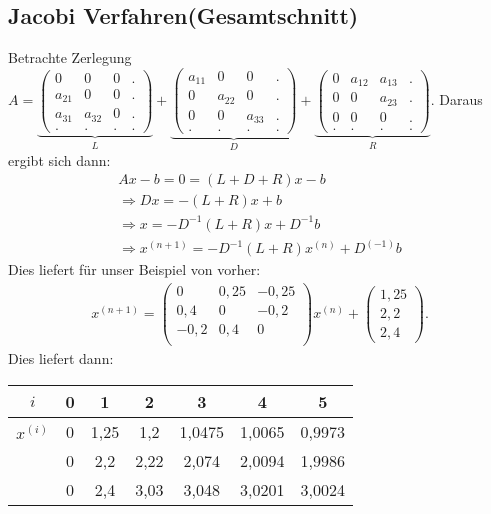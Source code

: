 \documentclass{scrartcl}
\begin{document}
\subsection{Jacobi Verfahren(Gesamtschnitt)}
Betrachte Zerlegung $A=\underbrace{\begin{pmatrix}
0 & 0 & 0 & .\\
a_{21} & 0 & 0 & . \\
a_{31} & a_{32} & 0 & .\\
.&.&.&.
\end{pmatrix}}_L+ \underbrace{\begin{pmatrix}
a_{11} & 0 & 0 & .\\
0 & a_{22} & 0 & . \\
0 & 0 & a_{33} & .\\
.&.&.&.
\end{pmatrix}}_D+
\underbrace{\begin{pmatrix}
0 & a_{12} & a_{13} & .\\
0 & 0 & a_{23} & . \\
0& 0 & 0 & .\\
.&.&.&.
\end{pmatrix}}_R$.
Daraus ergibt sich dann:
\begin{align*}
Ax-b=0=(L+D+R)x-b\\
\Rightarrow Dx=-(L+R)x+b \\
\Rightarrow x=-D^{-1}(L+R)x+D^{-1}b \\
\Rightarrow x^{(n+1)}=-D^{-1}(L+R)x^{(n)}+D^{(-1)}b
\end{align*}
Dies liefert für unser Beispiel von vorher:
\begin{align*}
x^{(n+1)}=\begin{pmatrix}
0 & 0,25 & -0,25 \\
0,4 & 0 & -0,2 \\
-0,2 & 0,4 & 0 \\
\end{pmatrix}x^{(n)}+\begin{pmatrix}
1,25\\
2,2\\
2,4
\end{pmatrix}.
\end{align*}
Dies liefert dann:
\begin{tabular}{c|cccccc}

$i$ & 0 & 1 & 2 & 3 & 4 & 5 \\ 
\hline 
$x^{(i)}$ & 0 & 1,25 & 1,2 & 1,0475 & 1,0065 & 0,9973 \\ 
 
& 0 & 2,2 & 2,22 & 2,074 & 2,0094 & 1,9986 \\ 

& 0 & 2,4 & 3,03 & 3,048 & 3,0201 & 3,0024 \\ 

\end{tabular} 
\end{document}
